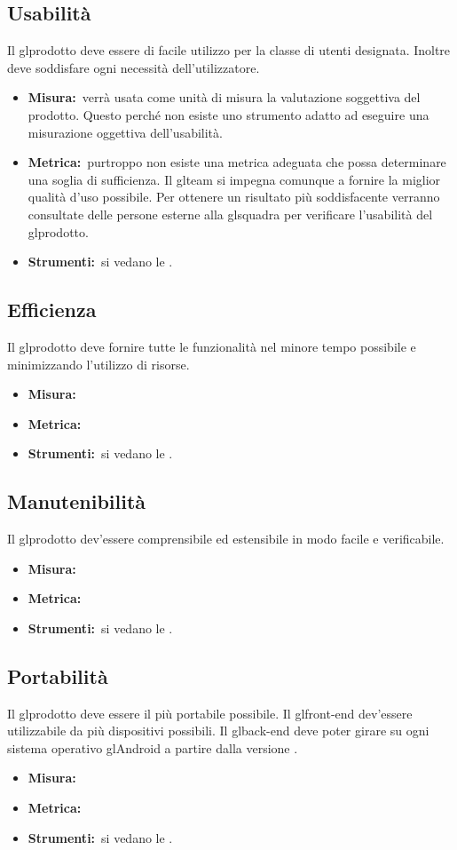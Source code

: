 \subsection{Usabilità}
Il gl{prodotto} deve essere di facile utilizzo per la classe di utenti designata. Inoltre deve soddisfare ogni necessità dell'utilizzatore.
\begin{itemize}
\item \textbf{Misura:}\ verrà usata come unità di misura la valutazione soggettiva del prodotto. Questo perché non esiste uno strumento adatto ad eseguire una misurazione oggettiva dell'usabilità.
\item \textbf{Metrica:}\ purtroppo non esiste una metrica adeguata che possa determinare una soglia di sufficienza. Il gl{team} si impegna comunque a fornire la miglior qualità d'uso possibile. Per ottenere un risultato più soddisfacente verranno consultate delle persone esterne alla gl{squadra} per verificare l'usabilità del gl{prodotto}. 
\item \textbf{Strumenti:}\ si vedano le \NPdoc.
\end{itemize}

\subsection{Efficienza}
Il gl{prodotto} deve fornire tutte le funzionalità nel minore tempo possibile e minimizzando l'utilizzo di risorse.
\begin{itemize}
\item \textbf{Misura:}\ 
\item \textbf{Metrica:}\
\item \textbf{Strumenti:}\ si vedano le \NPdoc.
\end{itemize}

\subsection{Manutenibilità}
Il gl{prodotto} dev'essere comprensibile ed estensibile in modo facile e verificabile.
\begin{itemize}
\item \textbf{Misura:}\
\item \textbf{Metrica:}\
\item \textbf{Strumenti:}\ si vedano le \NPdoc.
\end{itemize}

\subsection{Portabilità}
Il gl{prodotto} deve essere il più portabile possibile. Il gl{front-end} dev'essere utilizzabile da più dispositivi possibili. Il gl{back-end} deve poter girare su ogni sistema operativo gl{Android} a partire dalla versione .
\begin{itemize}
\item \textbf{Misura:}\
\item \textbf{Metrica:}\
\item \textbf{Strumenti:}\ si vedano le \NPdoc.
\end{itemize}

